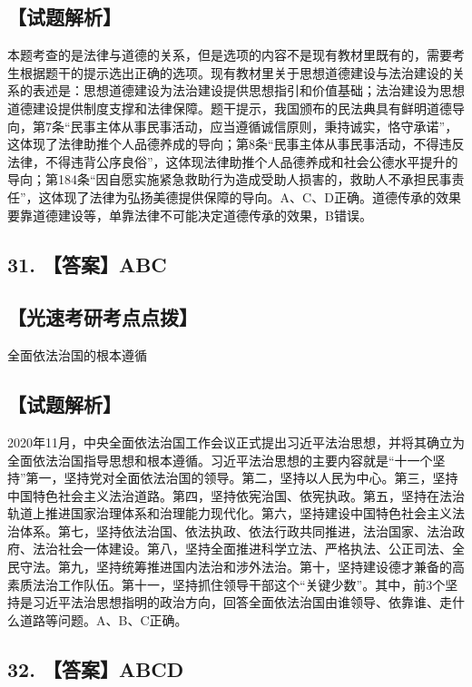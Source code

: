 \documentclass[UTF8,11pt]{ctexart}
\begin{document}
\subsection*{【试题解析】}

本题考查的是法律与道德的关系，但是选项的内容不是现有教材里既有的，需要考生根据题干的提示选出正确的选项。现有教材里关于思想道德建设与法治建设的关系的表述是：思想道德建设为法治建设提供思想指引和价值基础；法治建设为思想道德建设提供制度支撑和法律保障。题干提示，我国颁布的民法典具有鲜明道德导向，第7条“民事主体从事民事活动，应当遵循诚信原则，秉持诚实，恪守承诺”，这体现了法律助推个人品德养成的导向；第8条“民事主体从事民事活动，不得违反法律，不得违背公序良俗”，这体现法律助推个人品德养成和社会公德水平提升的导向；第184条“因自愿实施紧急救助行为造成受助人损害的，救助人不承担民事责任”，这体现了法律为弘扬美德提供保障的导向。A、C、D正确。道德传承的效果要靠道德建设等，单靠法律不可能决定道德传承的效果，B错误。


\subsection*{31. 【答案】ABC}

\subsection*{【光速考研考点点拨】}

全面依法治国的根本遵循


\subsection*{【试题解析】}

2020年11月，中央全面依法治国工作会议正式提出习近平法治思想，并将其确立为全面依法治国指导思想和根本遵循。习近平法治思想的主要内容就是“十一个坚持”第一，坚持党对全面依法治国的领导。第二，坚持以人民为中心。第三，坚持中国特色社会主义法治道路。第四，坚持依宪治国、依宪执政。第五，坚持在法治轨道上推进国家治理体系和治理能力现代化。第六，坚持建设中国特色社会主义法治体系。第七，坚持依法治国、依法执政、依法行政共同推进，法治国家、法治政府、法治社会一体建设。第八，坚持全面推进科学立法、严格执法、公正司法、全民守法。第九，坚持统筹推进国内法治和涉外法治。第十，坚持建设德才兼备的高素质法治工作队伍。第十一，坚持抓住领导干部这个“关键少数”。其中，前3个坚持是习近平法治思想指明的政治方向，回答全面依法治国由谁领导、依靠谁、走什么道路等问题。A、B、C正确。


\subsection*{32. 【答案】ABCD}
\end{document}
